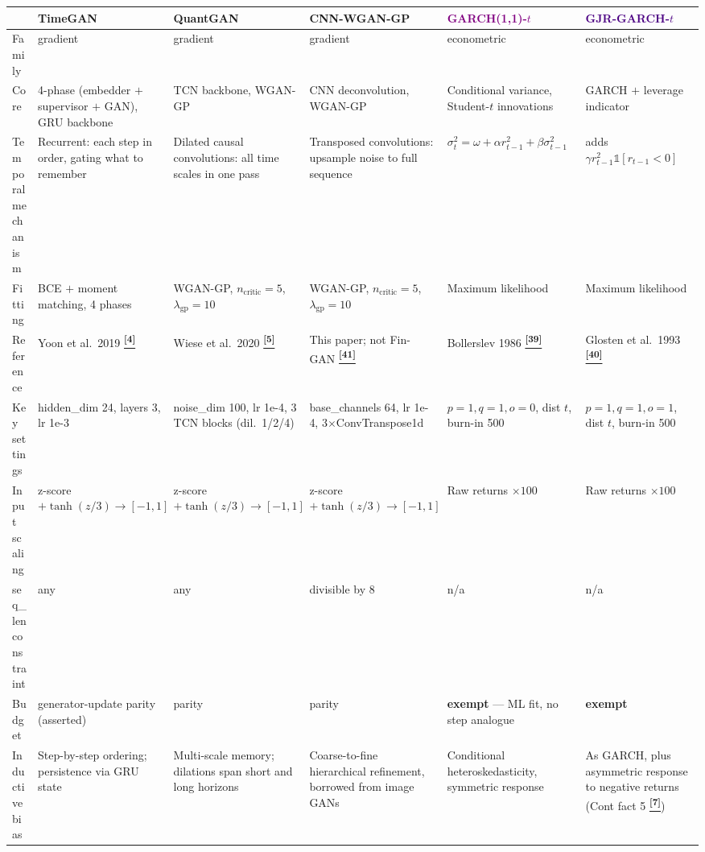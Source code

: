 \documentclass[10pt]{article}
\newcommand{\tcite}[1]{%
  \hyperlink{R:#1}{\textsuperscript{\scriptsize\textbf{[#1]}}}}
\begin{document}
\vspace{4pt}
{\footnotesize
\setlength{\tabcolsep}{4pt}
\begin{tabularx}{\linewidth}{@{}lXXXXX@{}}
\toprule
 & \textbf{\textcolor{TGcol}{TimeGAN}} & \textbf{\textcolor{QGcol}{QuantGAN}} & \textbf{\textcolor{FGcol}{CNN-WGAN-GP}} & \textbf{\textcolor{Purple}{GARCH(1,1)-$t$}} & \textbf{\textcolor{Indigo}{GJR-GARCH-$t$}} \\
\midrule
Family & gradient & gradient & gradient & econometric & econometric \\
Core & 4-phase (embedder $+$ supervisor $+$ GAN), GRU backbone & TCN backbone, WGAN-GP & CNN deconvolution, WGAN-GP & Conditional variance, Student-$t$ innovations & GARCH $+$ leverage indicator \\
Temporal mechanism & Recurrent: each step in order, gating what to remember & Dilated causal convolutions: all time scales in one pass & Transposed convolutions: upsample noise to full sequence & $\sigma_t^2=\omega+\alpha r_{t-1}^2+\beta\sigma_{t-1}^2$ & adds $\gamma r_{t-1}^2\mathbb{1}[r_{t-1}<0]$ \\
Fitting & BCE $+$ moment matching, 4 phases & WGAN-GP, $n_\text{critic}=5$, $\lambda_\text{gp}=10$ & WGAN-GP, $n_\text{critic}=5$, $\lambda_\text{gp}=10$ & Maximum likelihood & Maximum likelihood \\
Reference & Yoon et al.\ 2019\tcite{4} & Wiese et al.\ 2020\tcite{5} & This paper; not Fin-GAN\tcite{41} & Bollerslev 1986\tcite{39} & Glosten et al.\ 1993\tcite{40} \\
Key settings & hidden\_dim 24, layers 3, lr 1e-3 & noise\_dim 100, lr 1e-4, 3 TCN blocks (dil.\ 1/2/4) & base\_channels 64, lr 1e-4, 3$\times$ConvTranspose1d & $p{=}1,q{=}1,o{=}0$, dist $t$, burn-in 500 & $p{=}1,q{=}1,o{=}1$, dist $t$, burn-in 500 \\
Input scaling & z-score $+\tanh(z/3)\to[-1,1]$ & z-score $+\tanh(z/3)\to[-1,1]$ & z-score $+\tanh(z/3)\to[-1,1]$ & Raw returns $\times100$ & Raw returns $\times100$ \\
seq\_len constraint & any & any & divisible by 8 & n/a & n/a \\
Budget & generator-update parity (asserted) & parity & parity & \textbf{exempt} --- ML fit, no step analogue & \textbf{exempt} \\
Inductive bias & Step-by-step ordering; persistence via GRU state & Multi-scale memory; dilations span short and long horizons & Coarse-to-fine hierarchical refinement, borrowed from image GANs & Conditional heteroskedasticity, symmetric response & As GARCH, plus asymmetric response to negative returns (Cont fact 5\tcite{7}) \\
\bottomrule
\end{tabularx}}
\end{document}
